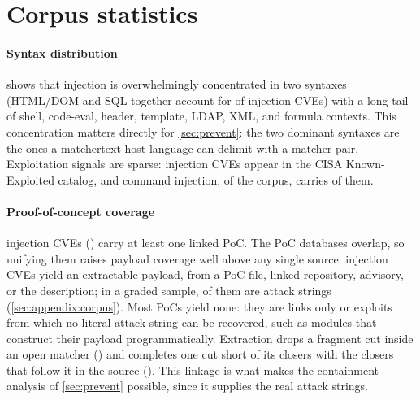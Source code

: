 \section{Corpus statistics}
\label{sec:results}

\begin{table}[t]
\centering
\caption{Largest injection syntax types, of \dataInjectionCVEs injection CVEs, with
the count carrying at least one linked proof-of-concept. : \dataSyntaxOther.}
\label{tab:syntax}
\small

\end{table}

\paragraph{Syntax distribution}
 shows that injection is overwhelmingly concentrated in two
syntaxes (HTML/DOM and SQL together account for \dataTopTwoShare of injection CVEs)
with a long tail of shell, code-eval, header, template, LDAP, XML, and
formula contexts.
This concentration matters directly for \cref{sec:prevent}: the two dominant
syntaxes are the ones a matchertext host language can delimit with a matcher pair.
Exploitation signals are sparse: \dataInjectionKev injection CVEs
appear in the CISA Known-Exploited catalog, and command injection, \dataCommandShare
of the corpus, carries \dataKevCommandShare of them.

\paragraph{Proof-of-concept coverage}
\textbf{\dataInjectionWithPoc} injection CVEs (\dataInjectionWithPocShare) carry at least one linked PoC.
The PoC databases overlap, so unifying them raises payload coverage well
above any single source. \textbf{\dataPayloadBackedCVEs} injection CVEs yield an
extractable payload, from a PoC file, linked repository, advisory, or the
description; in a graded sample, \dataPayloadPrecisionAllShare of them are attack
strings (\cref{sec:appendix:corpus}). Most PoCs yield none: they
are links only or exploits from which no literal attack string can be recovered, such as modules
that construct their payload programmatically.
Extraction drops a fragment cut inside an open matcher (\dataBalanceDropped) and
completes one cut short of its closers with the closers that follow it in the
source (\dataBalanceCompleted).
This linkage is what makes the containment analysis
of \cref{sec:prevent} possible, since it supplies the real attack strings.

